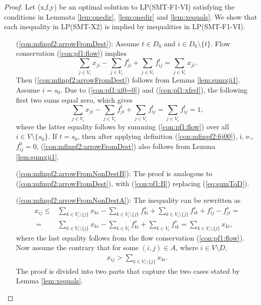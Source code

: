 \begin{proof}
Let (x,f,y) be an optimal solution to LP(SMT-F1-VI) satisfying the conditions in Lemmata \ref{lem:onedir}, \ref{lem:onedir} and \ref{lem:xequals}.
We show that each inequality in LP(SMT-X2) is implied by inequalities in LP(SMT-F1-VI).

\begin{itemize}[leftmargin=1cm]
\item[ (\ref{con:mfinpf2:arrowFromDest}):] Assume $t\in D_0$ and $i\in D_0\setminus\{t\}$. Flow conservation (\ref{con:pf1:flow}) implies
	$$\sum_{j\in V_i}x_{ji} - \sum_{j\in V_i}f_{ji}^t + \sum_{j\in V_i}f_{ij}^t = \sum_{j\in V_i}x_{ji}.$$ Then (\ref{con:mfinpf2:arrowFromDest}) follows from Lemma \ref{lem:sumxji1}.
	Assume $i=s_0$. Due to (\ref{con:pf1:xi0=0}) and (\ref{con:pf1:xfrel}), the following first two sums equal zero, which gives
	$$\sum_{j\in V_i}x_{ji} - \sum_{j\in V_i}f_{ji}^t + \sum_{j\in V_i}f_{ij}^t = \sum_{j\in V_i}f_{ij}^t = 1,$$
	where the latter equality follows by summing (\ref{con:pf1:flow}) over all $i\in V\setminus\{s_0\}$. If $t=s_0$, then after applying definition (\ref{con:mfinpf2:fij00}), i. e., $f^0_{ij}=0$, (\ref{con:mfinpf2:arrowFromDest})  also follows from Lemma \ref{lem:sumxji1}. 
\item[ (\ref{con:mfinpf2:arrowFromNonDestB}):] The proof is analogous to (\ref{con:mfinpf2:arrowFromDest}), with (\ref{con:pf1:B}) replacing (\ref{eq:sumToD}).
\item[ (\ref{con:mfinpf2:arrowFromNonDestA}):] The inequality can be rewritten as
	\begin{align*}
	 x_{ij}  \leq& \sum\limits_{k \in V_i\setminus\{j\}}x_{ki}-\sum\limits_{k \in V_i\setminus\{j\}}f^s_{ki}+\sum\limits_{k \in V_i\setminus\{j\}}f^s_{ik} +f^s_{ij}-f^s_{ji} = \\
	 ~=& \sum\limits_{k \in V_i\setminus\{j\}}x_{ki}-\sum\limits_{k \in V_i}f^s_{ki}+\sum\limits_{k \in V_i}f^s_{ik} = \sum\limits_{k \in V_i\setminus\{j\}}x_{ki},
	\end{align*}
	where the last equality follows from the flow conservation (\ref{con:pf1:flow}). Now assume the contrary that for some $(i,j)\in A$, where $i\in V\setminus D$,
	\begin{align}
	x_{ij} > \sum\limits_{k \in V_i\setminus\{j\}}x_{ki}.\label{eq:assumContr}
	\end{align}
	The proof is divided into two parts that capture the two cases stated by Lemma \ref{lem:xequals}.

\end{itemize}
\end{proof}
